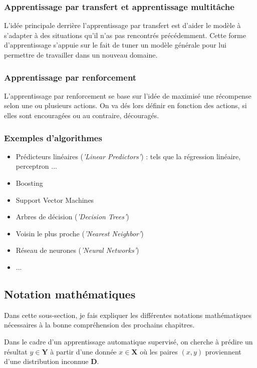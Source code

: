 \documentclass[a4paper]{article}
\begin{document}
\subsubsection{Apprentissage par transfert et apprentissage multitâche}
L'idée principale derrière l'apprentissage par transfert est d'aider le modèle à s'adapter à des situations qu'il n'as pas rencontrés précédemment. Cette forme d'apprentissage s'appuie sur le fait de tuner un modèle générale pour lui permettre de travailler dans un nouveau domaine.

\newpage

\subsubsection{Apprentissage par renforcement}
L'apprentissage par renforcement se base sur l'idée de maximisé une récompense selon une ou plusieurs actions. On va dés lors définir en fonction des actions, si elles sont encouragées ou au contraire, découragés.

\subsubsection{Exemples d'algorithmes}

\begin{itemize}
	\item Prédicteurs linéaires (\textit{'Linear Predictors'}) : tels que la régression linéaire, perceptron ...
	\item Boosting
	\item Support Vector Machines
	\item Arbres de décision (\textit{'Decision Trees'})
	\item Voisin le plus proche (\textit{'Nearest Neighbor'})
	\item Réseau de neurones (\textit{'Neural Networks'})
	\item ...
\end{itemize}

\newpage

\subsection{Notation mathématiques}
Dans cette sous-section, je fais expliquer les différentes notations mathématiques nécessaires à la bonne compréhension des prochains chapitres.

Dans le cadre d'un apprentissage automatique supervisé, on cherche à prédire un résultat $y\in \bm{Y}$ à partir d'une donnée $x \in \bm{X}$ où les paires $(x,y)$ proviennent d'une distribution inconnue $\bm{D}$. \newline
\end{document}
